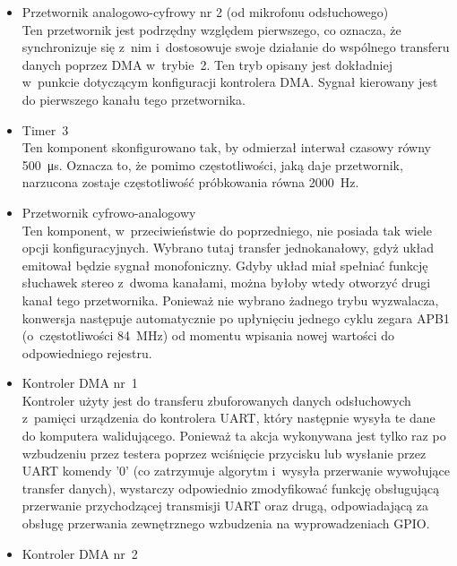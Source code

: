 \begin{itemize}
\begin{center}
\end{center}
	W~związku z~tym, przetwornik w~takiej konfiguracji będzie mógł efektywnie konwertować sygnały o~maksymalnej częstotliwości równej \SI{3811}{\Hz}. Należy jednak wziąć pod uwagę czas, jaki zajmą obliczenia generujące sygnał przeciwstawny, częstotliwość wzbudzeń pochodzących od timera oraz czas konwersji DAC. Wszystkie te oraz inne czynniki składają się na zmniejszenie efektywnej zdolności przetwarzania układu.
	\item Przetwornik analogowo-cyfrowy nr 2 (od mikrofonu odsłuchowego)\\
	Ten przetwornik jest podrzędny względem pierwszego, co oznacza, że synchronizuje się z~nim i~dostosowuje swoje działanie do wspólnego transferu danych poprzez DMA w~trybie~2. Ten tryb opisany jest dokładniej w~punkcie dotyczącym konfiguracji kontrolera DMA. Sygnał kierowany jest do pierwszego kanału tego przetwornika.
	\item Timer~3\\
	Ten komponent skonfigurowano tak, by odmierzał interwał czasowy równy \SI{500}{\micro\s}. Oznacza to, że pomimo częstotliwości, jaką daje przetwornik, narzucona zostaje częstotliwość próbkowania równa \SI{2000}{\Hz}. 
	\item Przetwornik cyfrowo-analogowy\\
	Ten komponent, w~przeciwieństwie do poprzedniego, nie posiada tak wiele opcji konfiguracyjnych. Wybrano tutaj transfer jednokanałowy, gdyż układ emitował będzie sygnał monofoniczny. Gdyby układ miał spełniać funkcję słuchawek stereo z~dwoma kanałami, można byłoby wtedy otworzyć drugi kanał tego przetwornika. Ponieważ nie wybrano żadnego trybu wyzwalacza, konwersja następuje automatycznie po upłynięciu jednego cyklu zegara APB1 (o~częstotliwości \SI{84}{\MHz}) od momentu wpisania nowej wartości do odpowiedniego rejestru.
	\item Kontroler DMA nr~1\\
	Kontroler użyty jest do transferu zbuforowanych danych odsłuchowych z~pamięci urządzenia do kontrolera UART, który następnie wysyła te dane do komputera walidującego. Ponieważ ta akcja wykonywana jest tylko raz po wzbudzeniu przez testera poprzez wciśnięcie przycisku lub wysłanie przez UART komendy '0' (co zatrzymuje algorytm i~wysyła przerwanie wywołujące transfer danych), wystarczy odpowiednio zmodyfikować funkcję obsługującą przerwanie przychodzącej transmisji UART oraz drugą, odpowiadającą za obsługę przerwania zewnętrznego wzbudzenia na wyprowadzeniach GPIO.
	\item Kontroler DMA nr~2\\

\end{itemize}
